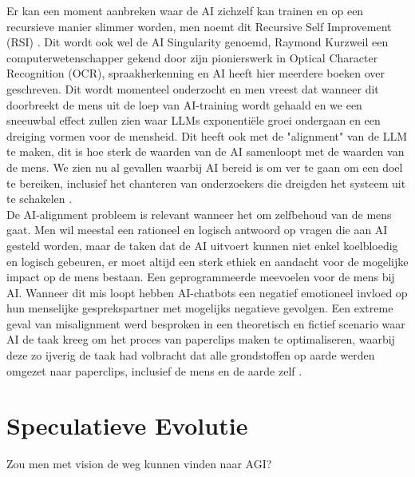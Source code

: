 Er kan een moment aanbreken waar de AI zichzelf kan trainen en op een recursieve manier slimmer worden, men noemt dit Recursive Self Improvement (RSI) \autocite{Yin2024}. Dit wordt ook wel de AI Singularity genoemd, Raymond Kurzweil een computerwetenschapper gekend door zijn pionierswerk in Optical Character Recognition (OCR), spraakherkenning en AI heeft hier meerdere boeken over geschreven. Dit wordt momenteel onderzocht en men vreest dat wanneer dit doorbreekt de mens uit de loep van AI-training wordt gehaald en we een sneeuwbal effect zullen zien waar LLMs exponentiële groei ondergaan en een dreiging vormen voor de mensheid. Dit heeft ook met de "alignment" van de LLM te maken, dit is hoe sterk de waarden van de AI samenloopt met de waarden van de mens. We zien nu al gevallen waarbij AI bereid is om ver te gaan om een doel te bereiken, inclusief het chanteren van onderzoekers die dreigden het systeem uit te schakelen \autocite{McMahon2025}. \\ %

De AI-alignment probleem is relevant wanneer het om zelfbehoud van de mens gaat. Men wil meestal een rationeel en logisch antwoord op vragen die aan AI gesteld worden, maar de taken dat de AI uitvoert kunnen niet enkel koelbloedig en logisch gebeuren, er moet altijd een sterk ethiek en aandacht voor de mogelijke impact op de mens bestaan. Een geprogrammeerde meevoelen voor de mens bij AI. Wanneer dit mis loopt hebben AI-chatbots een negatief emotioneel invloed op hun menselijke gesprekspartner met mogelijks negatieve gevolgen. Een extreme geval van misalignment werd besproken in een theoretisch en fictief scenario waar AI de taak kreeg om het proces van paperclips maken te optimaliseren, waarbij deze zo ijverig de taak had volbracht dat alle grondstoffen op aarde werden omgezet naar paperclips, inclusief de mens en de aarde zelf \autocite{Bostrom2014}.


\section{Speculatieve Evolutie}
\label{sec:speculatieveevolutie}
Zou men met vision de weg kunnen vinden naar AGI? \\

